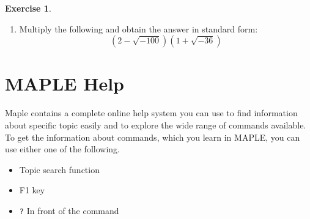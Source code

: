 \documentclass[
]{book}
\providecommand{\tightlist}{%
  \setlength{\itemsep}{0pt}\setlength{\parskip}{0pt}}
\theoremstyle{definition}
\theoremstyle{definition}
\theoremstyle{definition}
\newtheorem{exercise}{Exercise}[chapter]
\theoremstyle{definition}
\theoremstyle{remark}
\begin{document}
\begin{exercise}
\protect\hypertarget{exr:unnamed-chunk-72}{}\label{exr:unnamed-chunk-72}\leavevmode

\begin{enumerate}
\def\labelenumi{\arabic{enumi}.}
\setcounter{enumi}{2}
\tightlist
\item
  Multiply the following and obtain the answer in standard form:
  \[(2 − \sqrt{−100})(1 + \sqrt{−36})\]
\end{enumerate}

\end{exercise}

\section{MAPLE Help}\label{maple-help-1}

Maple contains a complete online help system you can use to find information about specific topic easily and to explore the wide range of commands available. To get the information about commands, which you learn in MAPLE, you can use either one of the following.

\begin{itemize}
\tightlist
\item
  Topic search function
\item
  F1 key
\item
  \texttt{?} In front of the command
\end{itemize}

  
\end{document}
